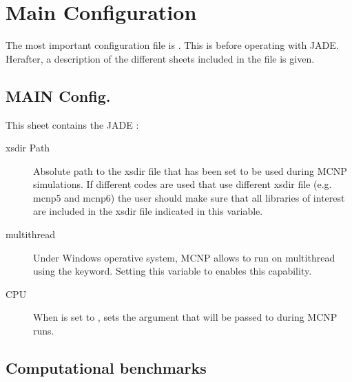 \documentclass[letterpaper,10pt,english]{sphinxmanual}
\let\sphinxpxdimen\pdfpxdimen\else\newdimen\sphinxpxdimen
\begin{document}
\section{Main Configuration}
\label{\detokenize{usage/configuration:main-configuration}}\label{\detokenize{usage/configuration:mainconfig}}
\sphinxAtStartPar
The most important configuration file is .
This is  before operating with JADE.
Herafter, a description of the different sheets included in the file is given.


\subsection{MAIN Config.}
\label{\detokenize{usage/configuration:main-config}}
\noindent\sphinxincludegraphics[width=600\sphinxpxdimen]{{main}.png}

\sphinxAtStartPar
This sheet contains the JADE :
\begin{description}
\item[{xsdir Path}] \leavevmode
\sphinxAtStartPar
Absolute path to the xsdir file that has been set to be used during MCNP simulations.
If different codes are used that use different xsdir file (e.g. mcnp5 and mcnp6) the
user should make sure that all libraries of interest are included in the xsdir file
indicated in this variable.

\item[{multithread}] \leavevmode
\sphinxAtStartPar
Under Windows operative system, MCNP allows to run on multithread using the 
keyword. Setting this variable to  enables this capability.

\item[{CPU}] \leavevmode
\sphinxAtStartPar
When  is set to ,  sets the argument that will be passed
to  during MCNP runs.

\end{description}


\subsection{Computational benchmarks}
\label{\detokenize{usage/configuration:computational-benchmarks}}\label{\detokenize{usage/configuration:compsheet}}
\noindent\sphinxincludegraphics[width=600\sphinxpxdimen]{{comp}.jpg}
\end{document}
